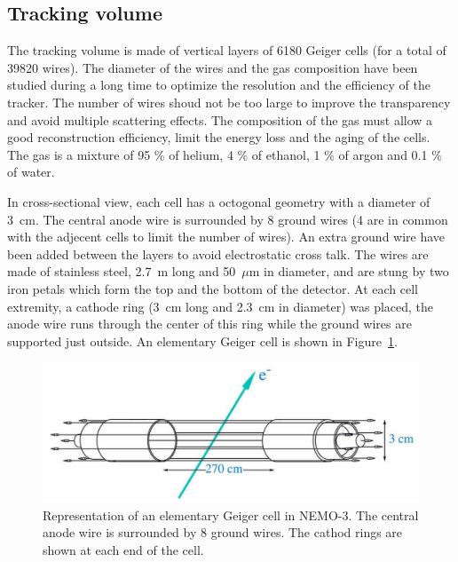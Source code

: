 \documentclass[main.tex]{subfiles}
\begin{document}
\subsection{Tracking volume}


\NI The tracking volume is made of vertical layers of 6180 Geiger cells (for a total of 39820 wires). The diameter of the wires and the gas composition have been studied during a long time to optimize the resolution and the efficiency of the tracker. The number of wires shoud not be too large to improve the transparency and avoid multiple scattering effects. The composition of the gas must allow a good reconstruction efficiency, limit the energy loss and the aging of the cells. The gas is a mixture of 95 \% of helium, 4 \% of ethanol, 1 \% of argon and 0.1 \% of water. 


\bigskip


\NI In cross-sectional view, each cell has a octogonal geometry with a diameter of 3~cm. The central anode wire is surrounded by 8 ground wires (4 are in common with the adjecent cells to limit the number of wires). An extra ground wire have been added between the layers to avoid electrostatic cross talk. The wires are made of stainless steel, 2.7~m long and 50~$\mu$m in diameter, and are stung by two iron petals which form the top and the bottom of the detector. At each cell extremity, a  cathode ring (3~cm long and 2.3~cm in diameter) was placed, the anode wire runs through the center of this
ring while the ground wires are supported just outside. An elementary Geiger cell is shown in Figure~\ref{GeigerCellNEMO3}.


\begin{figure}[h!]
\begin{center}
\includegraphics[scale=0.3]{pictures/Chap3/GeigerCellNEMO3.png}
\caption{Representation of an elementary Geiger cell in NEMO-3. The central anode wire is surrounded by 8 ground wires. The cathod rings are shown at each end of the cell.}
\label{GeigerCellNEMO3}
\end{center}
\end{figure}
\end{document}

